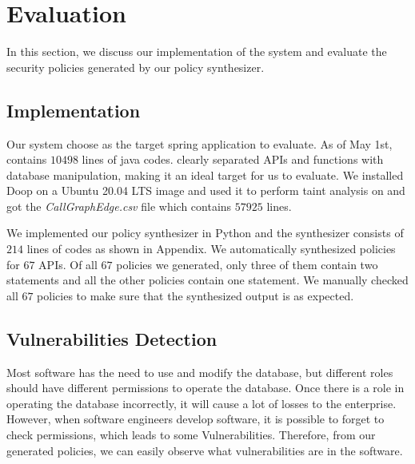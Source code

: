 \section{Evaluation}%




In this section, we discuss our implementation of the system and evaluate the
security policies generated by our policy synthesizer.

\subsection{Implementation}
Our system choose \lancie as the target spring application to evaluate.
%
As of May 1st, \lancie contains $10498$ lines of java codes.
%
\lancie clearly separated APIs and functions with database manipulation, making
it an ideal target for us to evaluate.
%
We installed Doop on a Ubuntu 20.04 LTS image and used it to perform taint
analysis on \lancie and got the \textit{CallGraphEdge.csv} file which contains
$57925$ lines.

We implemented our policy synthesizer in Python and the synthesizer consists of
$214$ lines of codes as shown in Appendix.
%
We automatically synthesized policies for $67$ APIs.
%
Of all $67$ policies we generated, only three of them contain two statements and
all the other policies contain one statement.
%
We manually checked all $67$ policies to make sure that the synthesized output
is as expected.

\subsection{Vulnerabilities Detection}
Most software has the need to use and modify the database, but different roles
should have different permissions to operate the database. Once there is a role
in operating the database incorrectly, it will cause a lot of losses to the
enterprise. However, when software engineers develop software, it is possible to
forget to check permissions, which leads to some Vulnerabilities. Therefore,
from our generated policies, we can easily observe what vulnerabilities are in
the software.


